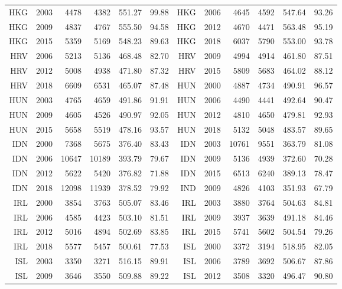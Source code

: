 {\begin{longtable}{r|r|r|r|r|r||r|r|r|r|r|r}
    HKG   & 2003  & 4478  & 4382  & 551.27 & 99.88 & HKG   & 2006  & 4645  & 4592  & 547.64 & 93.26 \\
    HKG   & 2009  & 4837  & 4767  & 555.50 & 94.58 & HKG   & 2012  & 4670  & 4471  & 563.48 & 95.19 \\
    HKG   & 2015  & 5359  & 5169  & 548.23 & 89.63 & HKG   & 2018  & 6037  & 5790  & 553.00 & 93.78 \\
    HRV   & 2006  & 5213  & 5136  & 468.48 & 82.70 & HRV   & 2009  & 4994  & 4914  & 461.80 & 87.51 \\
    HRV   & 2012  & 5008  & 4938  & 471.80 & 87.32 & HRV   & 2015  & 5809  & 5683  & 464.02 & 88.12 \\
    HRV   & 2018  & 6609  & 6531  & 465.07 & 87.48 & HUN   & 2000  & 4887  & 4734  & 490.91 & 96.57 \\
    HUN   & 2003  & 4765  & 4659  & 491.86 & 91.91 & HUN   & 2006  & 4490  & 4441  & 492.64 & 90.47 \\
    HUN   & 2009  & 4605  & 4526  & 490.97 & 92.05 & HUN   & 2012  & 4810  & 4650  & 479.81 & 92.93 \\
    HUN   & 2015  & 5658  & 5519  & 478.16 & 93.57 & HUN   & 2018  & 5132  & 5048  & 483.57 & 89.65 \\
    IDN   & 2000  & 7368  & 5675  & 376.40 & 83.43 & IDN   & 2003  & 10761 & 9551  & 363.79 & 81.08 \\
    IDN   & 2006  & 10647 & 10189 & 393.79 & 79.67 & IDN   & 2009  & 5136  & 4939  & 372.60 & 70.28 \\
    IDN   & 2012  & 5622  & 5420  & 376.82 & 71.88 & IDN   & 2015  & 6513  & 6240  & 389.13 & 78.47 \\
    IDN   & 2018  & 12098 & 11939 & 378.52 & 79.92 & IND   & 2009  & 4826  & 4103  & 351.93 & 67.79 \\
    IRL   & 2000  & 3854  & 3763  & 505.07 & 83.46 & IRL   & 2003  & 3880  & 3764  & 504.63 & 84.81 \\
    IRL   & 2006  & 4585  & 4423  & 503.10 & 81.51 & IRL   & 2009  & 3937  & 3639  & 491.18 & 84.46 \\
    IRL   & 2012  & 5016  & 4894  & 502.69 & 83.85 & IRL   & 2015  & 5741  & 5602  & 504.54 & 79.26 \\
    IRL   & 2018  & 5577  & 5457  & 500.61 & 77.53 & ISL   & 2000  & 3372  & 3194  & 518.95 & 82.05 \\
    ISL   & 2003  & 3350  & 3271  & 516.15 & 89.91 & ISL   & 2006  & 3789  & 3692  & 506.67 & 87.86 \\
    ISL   & 2009  & 3646  & 3550  & 509.88 & 89.22 & ISL   & 2012  & 3508  & 3320  & 496.47 & 90.80 \\

\end{longtable}}
